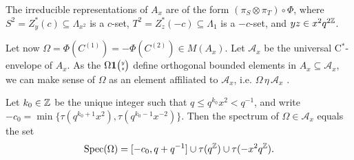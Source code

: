 \begin{Theorem} The irreducible representations of $A_x$ are of the form $(\pi_S\otimes \pi_T)\circ \Phi$, where $S^2 = Z_y^*(c) \subseteq \Lambda_{x^2}$ is a $c$-set, $T^2 = Z_z^*(-c)\subseteq \Lambda_1$ is a $-c$-set, and $yz \in x^2q^{2\mathbb{Z}}$. 
\end{Theorem}

Let now $\Omega = \Phi(C^{(1)}) = -\Phi(C^{(2)}) \in M(A_x)$. Let $\mathcal{A}_x$ be the universal C$^*$-envelope of $A_x$. As the $\Omega\mathbf{1}{\tiny {\begin{pmatrix} y\\z\end{pmatrix}}}$ define orthogonal bounded elements in $A_x\subseteq \mathcal{A}_x$, we can make sense of $\Omega$ as an element affiliated to $\mathcal{A}_x$, i.e. $\Omega\,\eta\,\mathcal{A}_x$ \cite{Wor2}. 


\begin{Cor} Let $k_0\in \mathbb{Z}$ be the unique integer such that $q\leq q^{k_0}x^2<q^{-1}$, and write $-c_{0} = \min \{\tau(q^{k_0+1}x^2),\tau(q^{k_0-1}x^{-2})\}$. Then the spectrum of $\Omega \in \mathcal{A}_x$ equals the set \[\operatorname{\mathrm{Spec}}(\Omega) = \lbrack -c_0,q+q^{-1}\rbrack \cup \tau(q^{\mathbb{Z}})\cup \tau (-x^2q^{\mathbb{Z}}).\]
\end{Cor}



%

%


